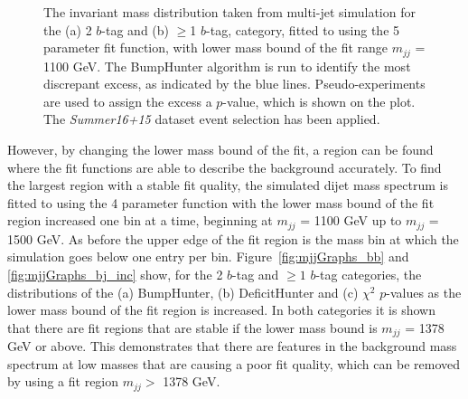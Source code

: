 \begin{figure}[!ht]
  \begin{center}
    \captionsetup[subfigure]{aboveskip=0pt,justification=centering}
  \end{center}
  \caption{ The invariant mass distribution taken from multi-jet simulation for the (a) 2 $b$-tag and (b) $\geq$1 $b$-tag,
    category, fitted to using the 5 parameter fit function, with lower mass bound of the fit range $m_{jj}$ = 1100 GeV.
    The BumpHunter algorithm is run to identify the most discrepant excess, as indicated by the blue lines.
    Pseudo-experiments are used to assign the excess a $p$-value, which is shown on the plot.
    The \textit{Summer16+15} dataset event selection has been applied.}
  \label{fig:Short_5para_1100_figure1}
\end{figure}

\FloatBarrier

However, by changing the lower mass bound of the fit,
a region can be found where the fit functions are able to describe the background accurately.
To find the largest region with a stable fit quality, the simulated dijet mass spectrum is
fitted to using the 4 parameter function with the lower mass bound of the fit region increased one bin at a time,
beginning at $m_{jj}$ = 1100 GeV up to $m_{jj}$ = 1500 GeV.
As before the upper edge of the fit region is the mass bin at which the simulation goes below one entry per bin.
Figure~\ref{fig:mjjGraphs_bb} and \ref{fig:mjjGraphs_bj_inc} show,
for the 2 $b$-tag and $\geq1$ $b$-tag categories, the distributions of the
(a) BumpHunter, (b) DeficitHunter and (c) $\chi^{2}$ $p$-values as the lower mass bound of the fit region is increased.
In both categories it is shown that there are fit regions that are stable if the lower mass bound is $m_{jj}$ = 1378 GeV or above.
This demonstrates that there are features in the background mass spectrum at low masses that are causing a poor fit quality,
which can be removed by using a fit region $m_{jj} >$ 1378 GeV. 

